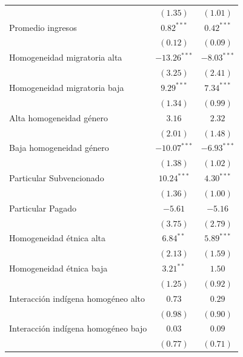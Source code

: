 \documentclass[
]{article}
\begin{document}
\begin{table}
\begin{center}
\begin{tabular}{l c c}
                                    & $(1.35)$       & $(1.01)$       \\
Promedio ingresos                   & $0.82^{***}$   & $0.42^{***}$   \\
                                    & $(0.12)$       & $(0.09)$       \\
Homogeneidad migratoria alta        & $-13.26^{***}$ & $-8.03^{***}$  \\
                                    & $(3.25)$       & $(2.41)$       \\
Homogeneidad migratoria baja        & $9.29^{***}$   & $7.34^{***}$   \\
                                    & $(1.34)$       & $(0.99)$       \\
Alta homogeneidad género            & $3.16$         & $2.32$         \\
                                    & $(2.01)$       & $(1.48)$       \\
Baja homogeneidad género            & $-10.07^{***}$ & $-6.93^{***}$  \\
                                    & $(1.38)$       & $(1.02)$       \\
Particular Subvencionado            & $10.24^{***}$  & $4.30^{***}$   \\
                                    & $(1.36)$       & $(1.00)$       \\
Particular Pagado                   & $-5.61$        & $-5.16$        \\
                                    & $(3.75)$       & $(2.79)$       \\
Homogeneidad étnica alta            & $6.84^{**}$    & $5.89^{***}$   \\
                                    & $(2.13)$       & $(1.59)$       \\
Homogeneidad étnica baja            & $3.21^{**}$    & $1.50$         \\
                                    & $(1.25)$       & $(0.92)$       \\
Interacción indígena homogéneo alto & $0.73$         & $0.29$         \\
                                    & $(0.98)$       & $(0.90)$       \\
Interacción indígena homogéneo bajo & $0.03$         & $0.09$         \\
                                    & $(0.77)$       & $(0.71)$       \\
\hline

\end{tabular}
\end{center}
\end{table}
\end{document}

